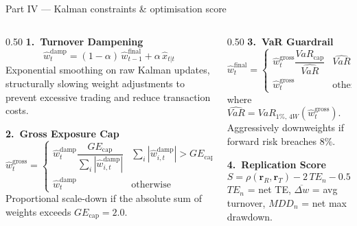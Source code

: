 \documentclass[10pt, aspectratio=169]{beamer}
\begin{document}
\begin{frame}{Part IV --- Kalman constraints \& optimisation score}
	\begin{columns}[T]
		\begin{column}{0.50\textwidth}
			\textbf{1.\ Turnover Dampening}
			\[
				\hat{w}_t^{\text{damp}} = (1 - \alpha)\,\hat{w}_{t-1}^{\text{final}} + \alpha\, \hat{x}_{t|t}
			\]
			{\scriptsize Exponential smoothing on raw Kalman updates, structurally slowing weight adjustments to prevent excessive trading and reduce transaction costs.}

			\smallskip
			\textbf{2.\ Gross Exposure Cap}
			{\scriptsize
				\[
					\hat{w}_t^{\text{gross}} =
					\begin{cases}
						\hat{w}_t^{\text{damp}} \dfrac{GE_{\text{cap}}}{\sum_i |\hat{w}_{i,t}^{\text{damp}}|}
						                        & \sum_i |\hat{w}_{i,t}^{\text{damp}}| > GE_{\text{cap}} \\[4pt]
						\hat{w}_t^{\text{damp}} & \text{otherwise}
					\end{cases}
				\]
			}
			{\scriptsize Proportional scale-down if the absolute sum of weights exceeds $GE_{\text{cap}} = 2.0$.}
		\end{column}
		\begin{column}{0.50\textwidth}
			\textbf{3.\ VaR Guardrail}
			{\footnotesize
				\[
					\hat{w}_t^{\text{final}} =
					\begin{cases}
						\hat{w}_t^{\text{gross}} \dfrac{VaR_{\text{cap}}}{\widehat{VaR}} & \widehat{VaR} > 8\% \\[4pt]
						\hat{w}_t^{\text{gross}}                                         & \text{otherwise}
					\end{cases}
				\]
			}{\scriptsize where $\widehat{VaR} = VaR_{1\%,\,4W}(\hat{w}_t^{\text{gross}})$.
				Aggressively downweights if forward risk breaches $8\%$.}

			\smallskip
			\textbf{4.\ Replication Score}
			{\footnotesize
				\[
					S = \rho(\mathbf{r}_R, \mathbf{r}_T) - 2\,TE_n - 0.5\,\overline{\Delta w} - 0.1\,MDD_n
				\]
			}{\scriptsize $TE_n$ = net TE, $\overline{\Delta w}$ = avg turnover, $MDD_n$ = net max drawdown.}
		\end{column}
	\end{columns}
\end{frame}
\end{document}
